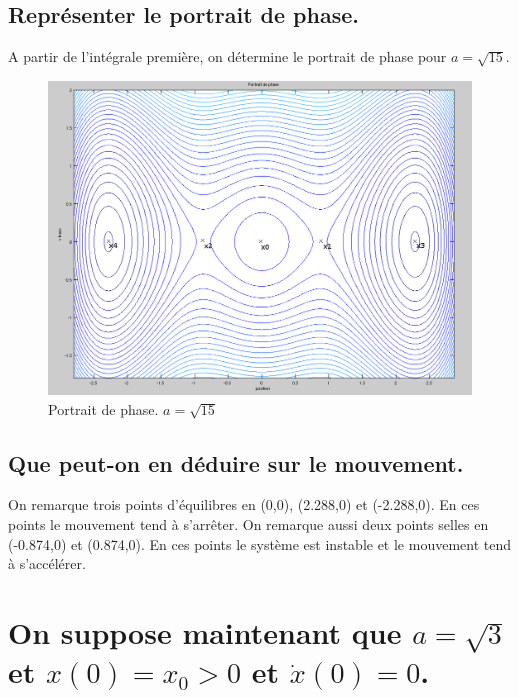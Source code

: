 \documentclass[10pt,a4paper]{article}
\begin{document}
 

	
\subsection{Représenter le portrait de phase.}
A partir de l'intégrale première, on détermine le portrait de phase pour $a=\sqrt{15}$.
\begin{figure}[H]
	\includegraphics[scale=0.5]{PortraitDePhasePointsVisibles.png}
	\caption{Portrait de phase. $a=\sqrt{15}$}
\end{figure} 

\subsection{Que peut-on en déduire sur le mouvement.}
On remarque trois points d'équilibres en (0,0), (2.288,0) et (-2.288,0). En ces points le mouvement tend à s'arrêter. On remarque aussi deux points selles en (-0.874,0) et (0.874,0). En ces points le système est instable et le mouvement tend à s'accélérer.%

\section{On suppose maintenant que $a=\sqrt{3}$ et $x(0)=x_0>0$ et $\dot{x}(0)=0$.}
\end{document}
